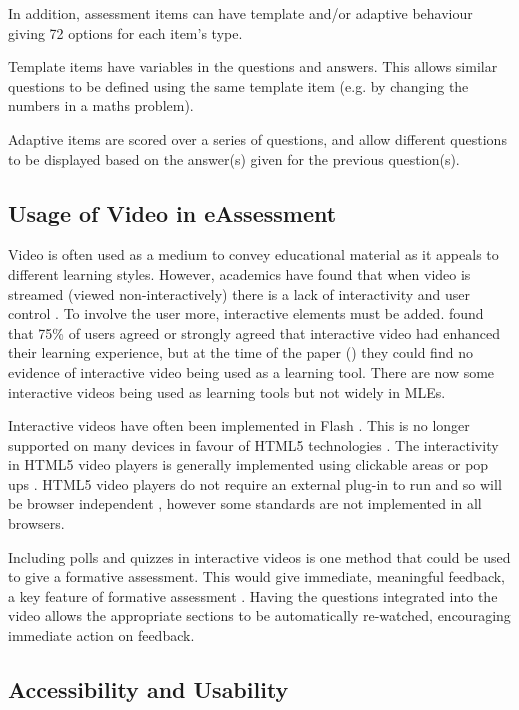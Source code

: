 In addition, assessment items can have template and/or adaptive behaviour giving 72 options for each item's type.

Template items have variables in the questions and answers. This allows similar questions to be defined using the same template item (e.g. by changing the numbers in a maths problem).

Adaptive items are scored over a series of questions, and allow different questions to be displayed based on the answer(s) given for the previous question(s).

\subsection{Usage of Video in eAssessment}
\label{Subsection:Usage of Video in eAssessment}
Video is often used as a medium to convey educational material as it appeals to different learning styles. However, academics have found that when video is streamed (viewed non-interactively) there is a lack of interactivity and user control \citep{eps267281, DeBoer}. To involve the user more, interactive elements must be added.  \citep{eps267281} found that 75\% of users agreed or strongly agreed that interactive video had enhanced their learning experience, but at the time of the paper (\citeyear{eps267281}) they could find no evidence of interactive video being used as a learning tool. There are now some interactive videos being used as learning tools \citep{nadia} but not widely in \glspl{MLE}.

Interactive videos have often been implemented in Flash \citep{interactiveVideo, eps267281}. This is no longer supported on many devices in favour of \gls{HTML5} technologies \citep{flashDead}. The interactivity in \gls{HTML5} video players is generally implemented using clickable areas or pop ups \citep{interactiveHTML5}. \gls{HTML5} video players do not require an external plug-in to run and so will be browser independent \citep{epifania2011design, interactiveHTML5}, however some standards are not implemented in all browsers.

Including polls and quizzes in interactive videos is one method that could be used to give a formative assessment. This would give immediate, meaningful feedback, a key feature of formative assessment \citep{eps265979}. Having the questions integrated into the video allows the appropriate sections to be automatically re-watched, encouraging immediate action on feedback.

\subsection{Accessibility and Usability}
\label{Subsection:Accessibility and Usability}

